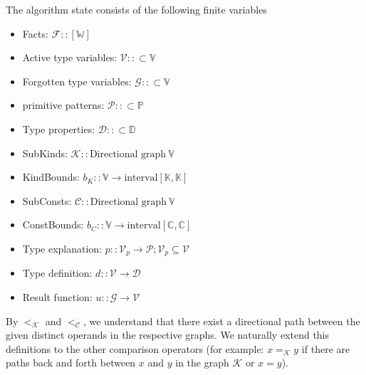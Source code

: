 \begin{defn}
    The algorithm state consists of the following finite variables
    \begin{itemize}
        \item Facts: $\mathcal{F} :: [\mathbb{W}]$
        \item Active type variables: $\mathcal{V} :: \subset \mathbb{V}$
        \item Forgotten type variables: $\mathcal{G} :: \subset \mathbb{V}$
        \item primitive patterns: $\mathcal{P} :: \subset \mathbb{P}$
        \item Type properties: $\mathcal{D} :: \subset \mathbb{D}$
        \item SubKinds: $\mathcal{K} :: \text{Directional graph}\ \mathbb{V}$
        \item KindBounds: $b_K :: \mathbb{V} \to \text{interval} \left[\mathbb{K}, \mathbb{K}\right]$
        \item SubConsts: $\mathcal{C} :: \text{Directional graph}\ \mathbb{V}$
        \item ConstBounds: $b_C :: \mathbb{V} \to \text{interval} \left[\mathbb{C}, \mathbb{C}\right]$
        \item Type explanation: $p :: \mathcal{V}_p \to \mathcal{P}; \mathcal{V}_p \subseteq \mathcal{V}$
        \item Type definition: $d :: \mathcal{V} \to \mathcal{D}$
        \item Result function: $u :: \mathcal{G} \to \mathcal{V}$
    \end{itemize}

    By $<_\mathcal{K}$ and $<_\mathcal{C}$, we understand that there exist a directional path between the given distinct operands in the respective graphs. We naturally extend this definitions to the other comparison operators (for example: $x =_\mathcal{K} y$ if there are paths back and forth between $x$ and $y$ in the graph $\mathcal{K}$ or $x = y$). %

\end{defn}

